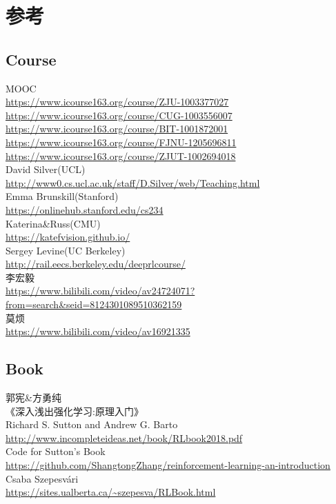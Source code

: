 \documentclass{book}
\begin{document}
\tableofcontents
\chapter{参考}
\section{Course}
\noindent MOOC\\
\url{https://www.icourse163.org/course/ZJU-1003377027}\\
\url{https://www.icourse163.org/course/CUG-1003556007}\\
\url{https://www.icourse163.org/course/BIT-1001872001}\\
\url{https://www.icourse163.org/course/FJNU-1205696811}\\
\url{https://www.icourse163.org/course/ZJUT-1002694018}\\
David Silver(UCL)\\
\url{http://www0.cs.ucl.ac.uk/staff/D.Silver/web/Teaching.html}\\
Emma Brunskill(Stanford)\\
\url{https://onlinehub.stanford.edu/cs234}\\
Katerina\&Russ(CMU)\\
\url{https://katefvision.github.io/}\\
Sergey Levine(UC Berkeley)\\
\url{http://rail.eecs.berkeley.edu/deeprlcourse/}\\
李宏毅\\
\url{https://www.bilibili.com/video/av24724071?from=search&seid=8124301089510362159}\\
莫烦\\
\url{https://www.bilibili.com/video/av16921335}
\section{Book}
\noindent 郭宪\&方勇纯\\
《深入浅出强化学习:原理入门》\\
Richard S. Sutton and Andrew G. Barto\\
\url{http://www.incompleteideas.net/book/RLbook2018.pdf}\\
Code for Sutton's Book\\
\url{https://github.com/ShangtongZhang/reinforcement-learning-an-introduction}\\
Csaba Szepesvári\\
\url{https://sites.ualberta.ca/~szepesva/RLBook.html}
\end{document}
